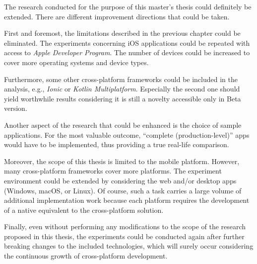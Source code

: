 The research conducted for the purpose of this master's thesis could definitely be extended. There are different improvement directions that could be taken.

First and foremost, the limitations described in the previous chapter could be eliminated. The experiments concerning iOS applications could be repeated with access to \emph{Apple Developer Program}. The number of devices could be increased to cover more operating systems and device types.

Furthermore, some other cross-platform frameworks could be included in the analysis, e.g., \emph{Ionic} or \emph{Kotlin Multiplatform}. Especially the second one should yield worthwhile results considering it is still a novelty accessible only in Beta version.

Another aspect of the research that could be enhanced is the choice of sample applications. For the most valuable outcome, ``complete (production-level)'' apps would have to be implemented, thus providing a true real-life comparison.

Moreover, the scope of this thesis is limited to the mobile platform. However, many cross-platform frameworks cover more platforms. The experiment environment could be extended by considering the web and/or desktop apps (Windows, macOS, or Linux). Of course, such a task carries a large volume of additional implementation work because each platform requires the development of a native equivalent to the cross-platform solution.

Finally, even without performing any modifications to the scope of the research proposed in this thesis, the experiments could be conducted again after further breaking changes to the included technologies, which will surely occur considering the continuous growth of cross-platform development.
